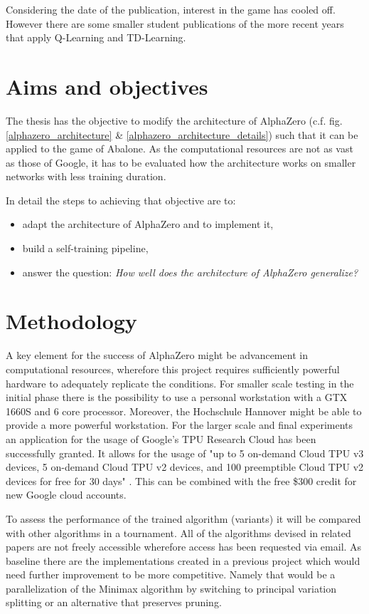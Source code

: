\documentclass{../lib/llncs}
\begin{document}
Considering the date of the publication, interest in the game has cooled off. However there are some smaller student publications of the more recent years that apply Q-Learning and TD-Learning. \cite{mizrachi_introduction_2017} \cite{lee_abalone_2005}

\section{Aims and objectives}
The thesis has the objective to modify the architecture of AlphaZero (c.f. fig. \ref{alphazero_architecture} \& \ref{alphazero_architecture_details}) such that it can be applied to the game of Abalone. As the computational resources are not as vast as those of Google, it has to be evaluated how the architecture works on smaller networks with less training duration.

In detail the steps to achieving that objective are to:

\begin{itemize}
  \item adapt the architecture of AlphaZero and to implement it,
  \item build a self-training pipeline,
  \item answer the question: \textit{How well does the architecture of AlphaZero generalize?}
\end{itemize}

\section{Methodology}
A key element for the success of AlphaZero might be advancement in computational resources, wherefore this project requires sufficiently powerful hardware to adequately replicate the conditions. For smaller scale testing in the initial phase there is the possibility to use a personal workstation with a GTX 1660S and 6 core processor. Moreover, the Hochschule Hannover might be able to provide a more powerful workstation. For the larger scale and final experiments an application for the usage of Google's TPU Research Cloud has been successfully granted. It allows for the usage of "up to 5 on-demand Cloud TPU v3 devices, 5 on-demand Cloud TPU v2 devices, and 100 preemptible Cloud TPU v2 devices for free for 30 days" \cite{noauthor_tpu_nodate}. This can be combined with the free \$300 credit for new Google cloud accounts. \cite{noauthor_free_nodate}

To assess the performance of the trained algorithm (variants) it will be compared with other algorithms in a tournament. All of the algorithms devised in related papers are not freely accessible wherefore access has been requested via email. As baseline there are the implementations created in a previous project \cite{noauthor_ture_nodate} which would need further improvement to be more competitive. Namely that would be a parallelization of the Minimax algorithm by switching to principal variation splitting or an alternative that preserves pruning. \cite{gao_multithreaded_nodate}
\end{document}
